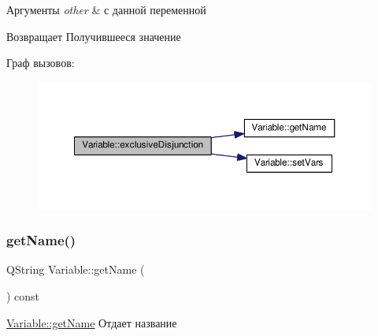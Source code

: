 \begin{DoxyParams}{Аргументы}
{\em other} & с данной переменной \\
\hline
\end{DoxyParams}
\begin{DoxyReturn}{Возвращает}
Получившееся значение 
\end{DoxyReturn}
Граф вызовов\+:\nopagebreak
\begin{figure}[H]
\begin{center}
\leavevmode
\includegraphics[width=350pt]{class_variable_a768fb534653ecc15e72f5d1201963705_cgraph}
\end{center}
\end{figure}
\mbox{\label{class_variable_a7e2bd08aff707fb67d67ce1914e9bb48}} 
\subsubsection{\texorpdfstring{get\+Name()}{getName()}}
{\footnotesize\ttfamily Q\+String Variable\+::get\+Name (\begin{DoxyParamCaption}{ }\end{DoxyParamCaption}) const}



\hyperlink{class_variable_a7e2bd08aff707fb67d67ce1914e9bb48}{Variable\+::get\+Name} Отдает название 

